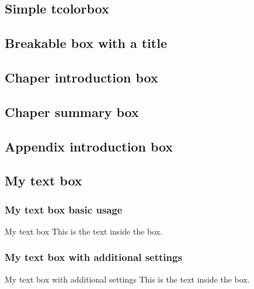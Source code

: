 \subsection{Simple tcolorbox}

\begin{tcolorbox}
\lipsum[4]
\end{tcolorbox}

\subsection{Breakable box with a title}

\begin{tcolorbox}[breakable, title = Breakable box with a title]
\lipsum[4]
\end{tcolorbox}

\subsection{Chaper introduction box}

\begin{chapterIntroBox}
\lipsum[4]
\end{chapterIntroBox}

\subsection{Chaper summary box}

\begin{chapterSummaryBox}
\lipsum[4]
\end{chapterSummaryBox}

\subsection{Appendix introduction box}

\begin{appendixIntroBox}
\lipsum[4]
\end{appendixIntroBox}

\subsection{My text box}

\subsubsection{My text box basic usage}

\begin{myTextBox}{My text box}
This is the text inside the box.
\end{myTextBox}

\subsubsection{My text box with additional settings}

\begin{myTextBox}[colframe=red]{My text box with additional settings}
This is the text inside the box.
\end{myTextBox}